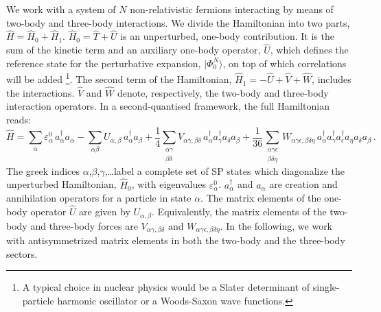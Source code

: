 We work with a system of $N$ non-relativistic fermions interacting by means of two-body and three-body interactions.
We divide the Hamiltonian into two parts, $\hat H = \hat H_0 + \hat H_1$. 
$\hat H_0 = \hat T + \hat U$ is an unperturbed, one-body contribution. It is 
the sum of the kinetic term and an auxiliary one-body operator, $\hat U$, which defines the reference 
state for the perturbative expansion, $\vert\Phi_0^N\rangle$, on top of which correlations will be added
\footnote{A typical choice in nuclear physics would be a Slater determinant of single-particle harmonic oscillator or a Woods-Saxon wave functions.}.  
The second term of the Hamiltonian, 
$\hat H_1 = -\hat U + \hat V + \hat W$, includes the interactions. $\hat V$ and $\hat W$ denote, respectively, the two-body and three-body interaction operators.
In a second-quantised framework, the full Hamiltonian reads:
\begin{equation}
\label{eq:H}
\hat H = \sum_{\alpha} \varepsilon^0_\alpha\, a^\dag_\alpha a_\alpha - \sum_{\alpha\beta}U_{\alpha,\beta}\, a^\dag_\alpha a_{\beta}
+\frac{1}{4} \sum_{\substack{\alpha\gamma\\\beta\delta}}V_{\alpha\gamma,\beta\delta}\, a_\alpha^\dag a_\gamma^\dag a_{\delta} a_{\beta}
+\frac{1}{36}\sum_{\substack{\alpha\gamma\epsilon \\ \beta\delta\eta}} W_{\alpha\gamma\epsilon,\beta\delta\eta}\,
a_\alpha^\dag a_\gamma^\dag a_\epsilon^\dag a_{\eta} a_{\delta} a_{\beta} \, .
\end{equation}
The greek indices $\alpha$,$\beta$,$\gamma$,\ldots label a complete set of SP states which diagonalize the unperturbed Hamiltonian, $\hat H_0$, with eigenvalues $\varepsilon_\alpha^0$. 
$a^\dag_\alpha$ and $a_\alpha$ are creation and annihilation operators for a particle in state $\alpha$. 
The matrix elements of the one-body operator $\hat U$ are given by $U_{\alpha,\beta}$. Equivalently, the matrix elements of the
two-body and three-body forces are $V_{\alpha\gamma,\beta\delta}$ and $W_{\alpha\gamma\epsilon,\beta\delta\eta}$. 
In the following, we work with antisymmetrized matrix elements in both the two-body and the three-body sectors.

